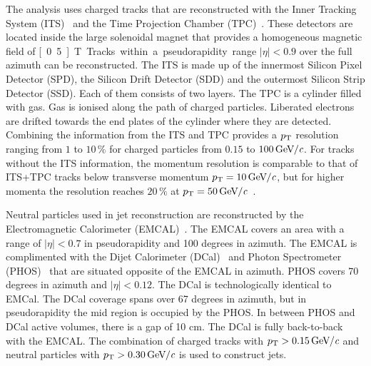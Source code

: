 The analysis uses charged tracks that are reconstructed with the Inner Tracking System (ITS)~\cite{aliceITS} and the Time Projection Chamber (TPC)~\cite{aliceTPC}. These detectors are located inside the large solenoidal magnet that provides a homogeneous magnetic field of \unit[0.5]{T}. Tracks within a pseudorapidity range $|\eta| < 0.9$ over the full azimuth can be reconstructed. The ITS is made up of the innermost Silicon Pixel Detector (SPD), the Silicon Drift Detector (SDD) and the outermost Silicon Strip Detector (SSD). Each of them consists of two layers. The TPC is a cylinder filled with gas. Gas is ionised along the path of charged particles. Liberated electrons are drifted towards the end plates of the cylinder where they are detected. Combining the information from the ITS and TPC provides a $p_{\rm T}$ resolution ranging from $1$ to $10\,\%$ for charged particles from $0.15$ to $\unit[100]{\GeVc}$. For tracks without the ITS information, the momentum resolution is comparable to that of ITS+TPC tracks below transverse momentum $\pt{} = \unit[10]{\GeVc}$, but for higher momenta the resolution reaches $20\,\%$ at $\pt{} = \unit[50]{\GeVc}$~\cite{alicePerformance,aliceBackgroundFluctuation}.

Neutral particles used in jet reconstruction are reconstructed by the Electromagnetic Calorimeter (EMCAL)~\cite{Cortese:2008zza}. The EMCAL covers an area with a range of $|\eta| < 0.7$  in pseudorapidity and 100 degrees in azimuth. The EMCAL is complimented with the Dijet Calorimeter (DCal)~\cite{DCAL} and Photon Spectrometer (PHOS)~\cite{PHOS} that are situated opposite of the EMCAL in azimuth. PHOS covers 70 degrees in azimuth and $\left| \eta \right| < 0.12$. The DCal is technologically identical to EMCal. The DCal coverage spans over 67 degrees in azimuth, but in pseudorapidity the mid region is occupied by the PHOS. In between PHOS and DCal active volumes, there is a gap of 10 cm. The DCal is fully back-to-back with the EMCAL.
The combination of charged tracks with  $\pt{} > \unit[0.15]{\GeVc}$ and neutral particles with $\pt{} > \unit[0.30]{\GeVc}$ is used to construct jets.

